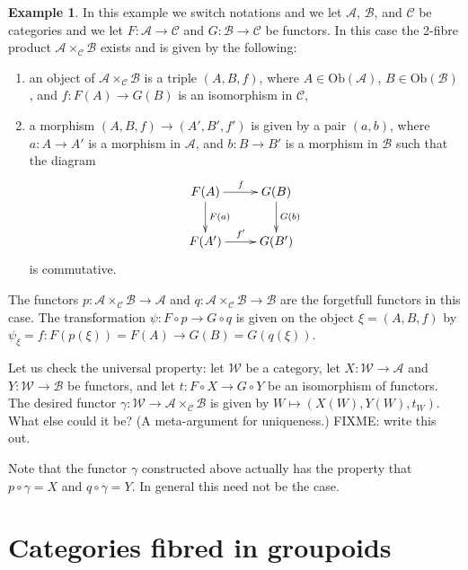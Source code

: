 \documentclass{amsart}
\theoremstyle{definition}
\newtheorem{example}[theorem]{Example}
\theoremstyle{remark}
\numberwithin{equation}{subsection}
\begin{document}
\begin{example}
\label{example-2-fibre-product-categories}
In this example we switch notations and we let $\mathcal{A}$, $\mathcal{B}$,
and $\mathcal{C}$ be categories and we let $F : \mathcal{A} \to \mathcal{C}$
and $G : \mathcal{B} \to \mathcal{C}$ be functors. In this case the 2-fibre
product $\mathcal{A}\times_\mathcal{C} \mathcal{B}$ exists and is given by
the following:
\begin{enumerate}
\item an object of $\mathcal{A}\times_\mathcal{C} \mathcal{B}$ is a triple
$(A,B,f)$, where $A\in \text{Ob}(\mathcal{A})$, $B\in \text{Ob}(\mathcal{B})$,
and $f : F(A) \to G(B)$ is an isomorphism in $\mathcal{C}$,
\item a morphism $(A,B,f) \to (A',B', f')$ is given by a pair $(a,b)$, where
$a : A \to A'$ is a morphism in $\mathcal{A}$, and $b : B \to B'$ is a
morphism in $\mathcal{B}$ such that the diagram 
$$
\xymatrix{
F(A) \ar[r]^f \ar[d]^{F(a)} & G(B) \ar[d]^{G(b)} \\
F(A') \ar[r]^{f'} & G(B')
}
$$
is commutative.
\end{enumerate}
The functors $p : \mathcal{A}\times_\mathcal{C}\mathcal{B} \to \mathcal{A}$
and $q : \mathcal{A}\times_\mathcal{C}\mathcal{B} \to \mathcal{B}$ are the
forgetfull functors in this case. The transformation $\psi : F \circ p \to
G \circ q$ is given on the object $\xi = (A,B,f)$ by
$\psi_\xi = f : F(p(\xi)) = F(A) \to G(B) = G(q(\xi))$.

\smallskip\noindent
Let us check the universal property: let $\mathcal{W}$ be a category, let
$X : \mathcal{W} \to \mathcal{A}$ and $Y : \mathcal{W} \to \mathcal{B}$ be
functors, and let $t : F \circ X \to G \circ Y$ be an isomorphism of functors.
The desired functor $\gamma : \mathcal{W} \to
\mathcal{A}\times_\mathcal{C}\mathcal{B}$
is given by $W \mapsto (X(W), Y(W), t_W)$. What else could it be? 
(A meta-argument for uniqueness.) FIXME: write this out.

\smallskip\noindent
Note that the functor $\gamma$ constructed above actually has the property
that $p \circ \gamma = X$ and $q \circ \gamma = Y$. In general this need not
be the case.
\end{example}

\section{Categories fibred in groupoids}
\label{subsection-fibred-groupoids}
\end{document}
